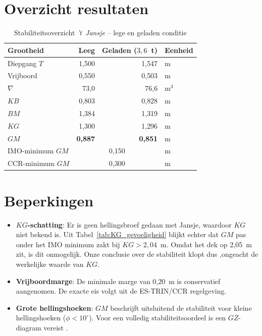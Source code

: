 \section{Overzicht resultaten}
\label{sec:stab_overzicht}

\begin{table}[H]
\centering
\caption{Stabiliteitsoverzicht \emph{'t~Jansje} -- lege en geladen conditie}
\label{tab:stab_overzicht}
\begin{tabular}{lrrl}
\toprule
Grootheid & Leeg & Geladen ($3{,}6$~t) & Eenheid \\
\midrule
Diepgang $T$             & 1{,}500 & 1{,}547 & m     \\
Vrijboord                & 0{,}550 & 0{,}503 & m     \\
$\nabla$                 & 73{,}0  & 76{,}6  & m$^3$ \\
\midrule
$KB$                     & 0{,}803 & 0{,}828 & m \\
$BM$                     & 1{,}384 & 1{,}319 & m \\
$KG$                     & 1{,}300 & 1{,}296 & m \\
\midrule
\rowcolor{green!15}
$GM$                     & \textbf{0{,}887} & \textbf{0{,}851} & m \\
IMO-minimum $GM$         & \multicolumn{2}{c}{0{,}150} & m \\
CCR-minimum $GM$ \cite{CCR2015} & \multicolumn{2}{c}{0{,}300} & m \\
\bottomrule
\end{tabular}
\end{table}

\section{Beperkingen}
\label{sec:stab_beperkingen}

\begin{itemize}
    \item \textbf{$KG$-schatting}: Er is geen hellingsbroef gedaan met Jansje,
          waardoor $KG$ niet bekend is. Uit
          Tabel~\ref{tab:KG_gevoeligheid} blijkt echter dat $GM$ pas onder
          het IMO minimum zakt bij $KG > 2{,}04$~m. Omdat het dek op
          2{,}05~m zit, is dit onmogelijk. Onze conclusie over de stabiliteit klopt dus ,ongeacht de werkelijke waarde van $KG$.

    \item \textbf{Vrijboordmarge}: De minimale marge van 0{,}20~m is
          conservatief aangenomen. De exacte eis volgt uit de ES-TRIN/CCR
          regelgeving.

    \item \textbf{Grote hellingshoeken}: $GM$ beschrijft uitsluitend de
         stabiliteit voor kleine hellingshoeken ($\phi < 10^\circ$). Voor een volledig
          stabiliteitsoordeel is een $GZ$-diagram vereist
          \cite[p.~134]{Barras2006}.
\end{itemize}

